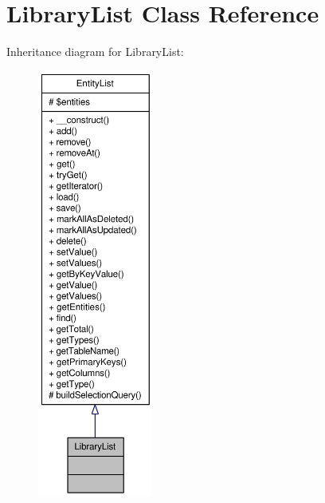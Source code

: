 \hypertarget{classLibraryList}{
\section{LibraryList Class Reference}
\label{classLibraryList}
}


Inheritance diagram for LibraryList:\nopagebreak
\begin{figure}[H]
\begin{center}
\leavevmode
\includegraphics[height=400pt]{classLibraryList__inherit__graph}
\end{center}
\end{figure}


